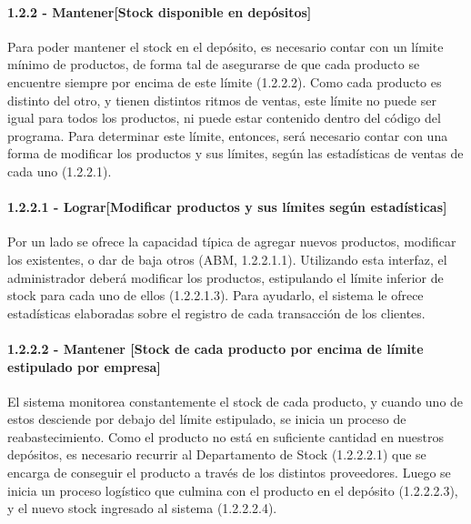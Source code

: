 \paragraph{1.2.2 - Mantener[Stock disponible en depósitos]} \label{para:1.2.2}

Para poder mantener el stock en el depósito, es necesario contar con un límite
mínimo de productos, de forma tal de asegurarse de que cada producto se
encuentre siempre por encima de este límite (1.2.2.2). Como cada producto es
distinto del otro, y tienen distintos ritmos de ventas, este límite no puede ser
igual para todos los productos, ni puede estar contenido dentro del código del
programa. Para determinar este límite, entonces, será necesario contar con una
forma de modificar los productos y sus límites, según las estadísticas de ventas
de cada uno (1.2.2.1).

\paragraph{1.2.2.1 - Lograr[Modificar productos y sus límites según estadísticas]} \label{para:1.2.2.1}

Por un lado se ofrece la capacidad típica de agregar nuevos productos, modificar
los existentes, o dar de baja otros (ABM, 1.2.2.1.1). Utilizando esta interfaz,
el administrador deberá modificar los productos, estipulando el límite inferior
de stock para cada uno de ellos (1.2.2.1.3). Para ayudarlo, el sistema le ofrece
estadísticas elaboradas sobre el registro de cada transacción de los clientes.

\paragraph{1.2.2.2 - Mantener [Stock de cada producto por encima de límite estipulado por empresa]} \label{para:1.2.2.2}

El sistema monitorea constantemente el stock de cada producto, y cuando uno de
estos desciende por debajo del límite estipulado, se inicia un proceso de
reabastecimiento. Como el producto no está en suficiente cantidad en nuestros
depósitos, es necesario recurrir al Departamento de Stock (1.2.2.2.1) que se
encarga de conseguir el producto a través de los distintos proveedores. Luego se
inicia un proceso logístico que culmina con el producto en el depósito
(1.2.2.2.3), y el nuevo stock ingresado al sistema (1.2.2.2.4).

